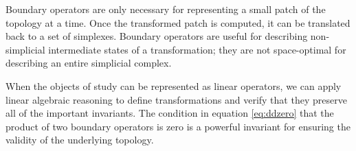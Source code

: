 \documentclass[twocolumn]{article}
\begin{document}
Boundary operators are only necessary for representing a small patch of the topology at a time.
Once the transformed patch is computed, it can be translated back to a set of simplexes.
Boundary operators are useful for describing non-simplicial intermediate states of a transformation; they are not space-optimal for describing an entire simplicial complex.

When the objects of study can be represented as linear operators, we can apply linear algebraic reasoning to define transformations and verify that they preserve all of the important invariants.
The condition in equation \eqref{eq:ddzero} that the product of two boundary operators is zero is a powerful invariant for ensuring the validity of the underlying topology.



\end{document}
